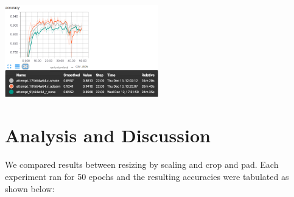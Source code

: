 \documentclass{article}
\begin{document}
\begin{minipage}[c]{\linewidth}
	
	\includegraphics[width=0.5\textwidth]{./figures/acc_smote_adaysn_none.png}
	
\end{minipage}


\section{Analysis and Discussion}
\paragraph{}
We compared results between resizing by scaling and crop and pad. Each experiment ran for 50 epochs and the resulting accuracies were tabulated as shown below:
\end{document}

